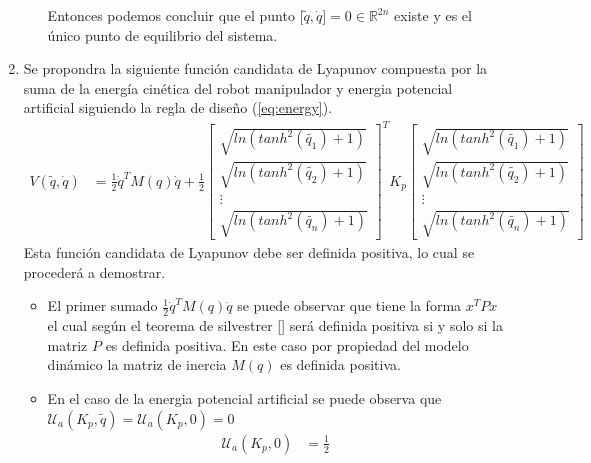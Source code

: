 \documentclass[12pt]{article}
\begin{document}
\begin{enumerate}
\begin{itemize}
        Entonces podemos concluir que el punto $\lbrack\tilde{q},\dot{q} \rbrack=0\in\mathbb{R}^{2n}$ existe y es el único punto de equilibrio del sistema. 
    \end{itemize} 
    \item Se propondra la siguiente función candidata de Lyapunov compuesta por la suma de la energía cinética del robot manipulador y energia potencial artificial siguiendo la regla de diseño (\ref{eq:energy}).
    \begin{equation}
        \begin{split}
            V(\tilde{q},\dot{q})&=\frac{1}{2}\dot{q}^TM(q)\dot{q}+\frac{1}{2}
            \begin{bmatrix}
                \sqrt{ln(tanh^2(\tilde{q_1})+1)}\\
                \sqrt{ln(tanh^2(\tilde{q_2})+1)}\\
                \vdots\\
                \sqrt{ln(tanh^2(\tilde{q_n})+1)}
            \end{bmatrix}^T
            K_p
            \begin{bmatrix}
                \sqrt{ln(tanh^2(\tilde{q_1})+1)}\\
                \sqrt{ln(tanh^2(\tilde{q_2})+1)}\\
                \vdots\\
                \sqrt{ln(tanh^2(\tilde{q_n})+1)}
            \end{bmatrix}
        \end{split}
        \label{eq:candidate}
    \end{equation}
    Esta función candidata de Lyapunov debe ser definida positiva, lo cual se procederá a demostrar.
    \begin{itemize}
        \item El primer sumado $\frac{1}{2}\dot{q}^TM(q)\dot{q}$ se puede observar que tiene la forma $x^TPx$ el cual según el teorema de silvestrer [\cite{reyes}] será definida positiva si y solo si la matriz $P$ es definida positiva. En este caso por propiedad del modelo dinámico la matriz de inercia $M(q)$ es definida positiva.
        \item En el caso de la energia potencial artificial se puede observa que $\mathcal{U}_a(K_p,\tilde{q})=\mathcal{U}_a(K_p,0)=0$
        \begin{equation}
            \begin{split}
                \mathcal{U}_a(K_p,0)&=
                \frac{1}{2}

\end{split}
\end{equation}
\end{itemize}
\end{enumerate}
\end{document}
